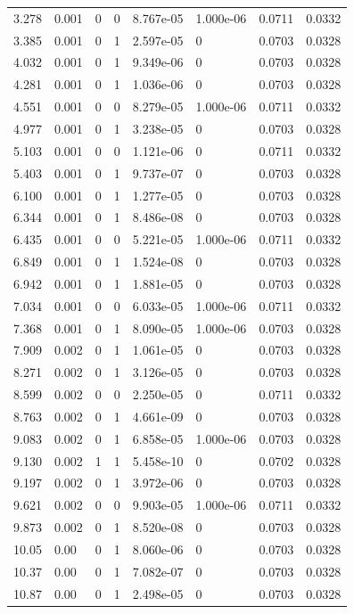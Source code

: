 \documentclass[preview]{standalone}
\begin{document}
{{\begin{tabular}{L{1.2cm}C{1.2cm} C{0.3cm}C{0.5cm} C{1.4cm}C{1.4cm} C{1.4cm}C{1.4cm}}
  3.278  &  0.001  & 0     &  0 &  8.767e-05  & 1.000e-06  & 0.0711 &  0.0332   \\ 
  3.385  &  0.001  & 0     &  1 &  2.597e-05  & 0  & 0.0703 &  0.0328   \\ 
  4.032  &  0.001  & 0     &  1 &  9.349e-06  & 0  & 0.0703 &  0.0328   \\ 
  4.281  &  0.001  & 0     &  1 &  1.036e-06  & 0  & 0.0703 &  0.0328   \\ 
  4.551  &  0.001  & 0     &  0 &  8.279e-05  & 1.000e-06  & 0.0711 &  0.0332   \\ 
  4.977  &  0.001  & 0     &  1 &  3.238e-05  & 0  & 0.0703 &  0.0328   \\ 
  5.103  &  0.001  & 0     &  0 &  1.121e-06  & 0  & 0.0711 &  0.0332   \\ 
  5.403  &  0.001  & 0     &  1 &  9.737e-07  & 0  & 0.0703 &  0.0328   \\ 
  6.100  &  0.001  & 0     &  1 &  1.277e-05  & 0  & 0.0703 &  0.0328   \\ 
  6.344  &  0.001  & 0     &  1 &  8.486e-08  & 0  & 0.0703 &  0.0328   \\ 
  6.435  &  0.001  & 0     &  0 &  5.221e-05  & 1.000e-06  & 0.0711 &  0.0332   \\ 
  6.849  &  0.001  & 0     &  1 &  1.524e-08  & 0  & 0.0703 &  0.0328   \\ 
  6.942  &  0.001  & 0     &  1 &  1.881e-05  & 0  & 0.0703 &  0.0328   \\ 
  7.034  &  0.001  & 0     &  0 &  6.033e-05  & 1.000e-06  & 0.0711 &  0.0332   \\ 
  7.368  &  0.001  & 0     &  1 &  8.090e-05  & 1.000e-06  & 0.0703 &  0.0328   \\ 
  7.909  &  0.002  & 0     &  1 &  1.061e-05  & 0  & 0.0703 &  0.0328   \\ 
  8.271  &  0.002  & 0     &  1 &  3.126e-05  & 0  & 0.0703 &  0.0328   \\ 
  8.599  &  0.002  & 0     &  0 &  2.250e-05  & 0  & 0.0711 &  0.0332   \\ 
  8.763  &  0.002  & 0     &  1 &  4.661e-09  & 0  & 0.0703 &  0.0328   \\ 
  9.083  &  0.002  & 0     &  1 &  6.858e-05  & 1.000e-06  & 0.0703 &  0.0328   \\ 
  9.130  &  0.002  & 1     &  1 &  5.458e-10  & 0  & 0.0702 &  0.0328   \\ 
  9.197  &  0.002  & 0     &  1 &  3.972e-06  & 0  & 0.0703 &  0.0328   \\ 
  9.621  &  0.002  & 0     &  0 &  9.903e-05  & 1.000e-06  & 0.0711 &  0.0332   \\ 
  9.873  &  0.002  & 0     &  1 &  8.520e-08  & 0  & 0.0703 &  0.0328   \\ 
  10.05  &  0.00  & 0     &  1 &  8.060e-06  & 0  & 0.0703 &  0.0328   \\ 
  10.37  &  0.00  & 0     &  1 &  7.082e-07  & 0  & 0.0703 &  0.0328   \\ 
  10.87  &  0.00  & 0     &  1 &  2.498e-05  & 0  & 0.0703 &  0.0328   \\ 
\hline 
\end{tabular} 

}}
\end{document}
